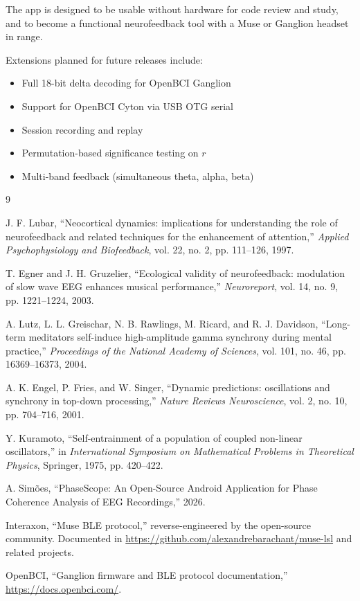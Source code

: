 \documentclass[11pt,a4paper]{article}
\begin{document}
The app is designed to be usable without hardware for code review and study, and to become a functional neurofeedback tool with a Muse or Ganglion headset in range.

Extensions planned for future releases include:
\begin{itemize}
\item Full 18-bit delta decoding for OpenBCI Ganglion
\item Support for OpenBCI Cyton via USB OTG serial
\item Session recording and replay
\item Permutation-based significance testing on $r$
\item Multi-band feedback (simultaneous theta, alpha, beta)
\end{itemize}

\begin{thebibliography}{9}

J. F. Lubar, ``Neocortical dynamics: implications for understanding the role of neurofeedback and related techniques for the enhancement of attention,'' \emph{Applied Psychophysiology and Biofeedback}, vol. 22, no. 2, pp. 111--126, 1997.

T. Egner and J. H. Gruzelier, ``Ecological validity of neurofeedback: modulation of slow wave EEG enhances musical performance,'' \emph{Neuroreport}, vol. 14, no. 9, pp. 1221--1224, 2003.

A. Lutz, L. L. Greischar, N. B. Rawlings, M. Ricard, and R. J. Davidson, ``Long-term meditators self-induce high-amplitude gamma synchrony during mental practice,'' \emph{Proceedings of the National Academy of Sciences}, vol. 101, no. 46, pp. 16369--16373, 2004.

A. K. Engel, P. Fries, and W. Singer, ``Dynamic predictions: oscillations and synchrony in top-down processing,'' \emph{Nature Reviews Neuroscience}, vol. 2, no. 10, pp. 704--716, 2001.

Y. Kuramoto, ``Self-entrainment of a population of coupled non-linear oscillators,'' in \emph{International Symposium on Mathematical Problems in Theoretical Physics}, Springer, 1975, pp. 420--422.

A. Sim\~oes, ``PhaseScope: An Open-Source Android Application for Phase Coherence Analysis of EEG Recordings,'' 2026.

Interaxon, ``Muse BLE protocol,'' reverse-engineered by the open-source community. Documented in \url{https://github.com/alexandrebarachant/muse-lsl} and related projects.

OpenBCI, ``Ganglion firmware and BLE protocol documentation,'' \url{https://docs.openbci.com/}.

\end{thebibliography}
\end{document}
